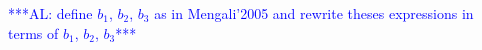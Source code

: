 \documentclass[AMA,STIX1COL]{WileyNJD-v2}
\newcommand{\uvect}[1]{\hat{#1}}
\newcommand{\vect}[1]{#1}
\renewcommand{\epsilon}{\varepsilon}
\newcommand{\bluetext}{\textcolor{blue}}
\newcommand{\com}[1]{\bluetext{***#1***}}
\begin{document}
\com{AL: define $b_1$, $b_2$, $b_3$ as in Mengali'2005 and rewrite theses expressions in terms of $b_1$, $b_2$, $b_3$}

\end{document}
